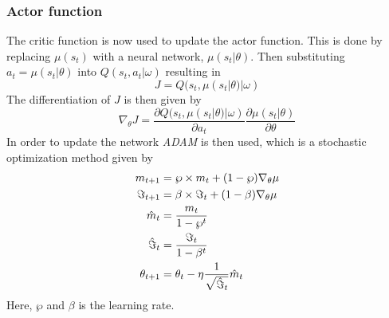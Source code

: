 \subsubsection{Actor function}
The critic function is now used to update the actor function. This is done by replacing $\mu(s_{t})$ with a neural network, $\mu(s_{t}|\theta)$. Then substituting $a_{t}=\mu(s_{t}|\theta)$ into $Q(s_{t},a_{t}|\omega)$ resulting in 
\begin{equation}
    J = Q(s_{t}, \mu(s_{t}|\theta)|\omega)
\end{equation}
The differentiation of $J$ is then given by
\begin{equation}
    \nabla_{\theta}J = \frac{\partial Q(s_{t}, \mu(s_{t}|\theta)|\omega)}{\partial a_{t}}\frac{\partial \mu(s_{t}|\theta)}{\partial\theta}
\end{equation}
In order to update the network \textit{ADAM} \cite{Kingma} is then used, which is a stochastic optimization method given by
\begin{align}
    m_{t+1} & = \wp\times m_{t}+(1-\wp)\nabla_{\theta}\mu \\
    \Im_{t+1} & = \beta\times\Im_{t}+(1-\beta)\nabla_{\theta}\mu \\
    \Hat{m}_{t} & = \frac{m_{t}}{1-\wp^{t}} \\
    \Hat{\Im}_{t} & = \frac{\Im_{t}}{1-\beta^{t}} \\
    \theta_{t+1} & = \theta_{t} - \eta\frac{1}{\sqrt{\Hat{\Im}_{t}}}\Hat{m}_{t}
\end{align}
Here, $\wp$ and $\beta$ is the learning rate.

